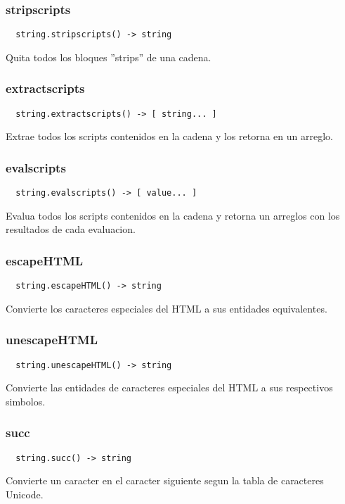 \subsubsection*{stripscripts}
\begin{verbatim}
  string.stripscripts() -> string
\end{verbatim}
Quita todos los bloques ''strips'' de una cadena.

\subsubsection*{extractscripts}
\begin{verbatim}
  string.extractscripts() -> [ string... ]
\end{verbatim}
Extrae todos los scripts contenidos en la cadena y los retorna en un arreglo.

\subsubsection*{evalscripts}
\begin{verbatim}
  string.evalscripts() -> [ value... ]
\end{verbatim}
Evalua todos los scripts contenidos en la cadena y retorna un arreglos con los resultados de cada evaluacion.

\subsubsection*{escapeHTML}
\begin{verbatim}
  string.escapeHTML() -> string
\end{verbatim}
Convierte los caracteres especiales del HTML a sus entidades equivalentes.

\subsubsection*{unescapeHTML}
\begin{verbatim}
  string.unescapeHTML() -> string
\end{verbatim}
Convierte las entidades de caracteres especiales del HTML a sus respectivos simbolos.

\subsubsection*{succ}
\begin{verbatim}
  string.succ() -> string
\end{verbatim}
Convierte un caracter en el caracter siguiente segun la tabla de caracteres Unicode.

